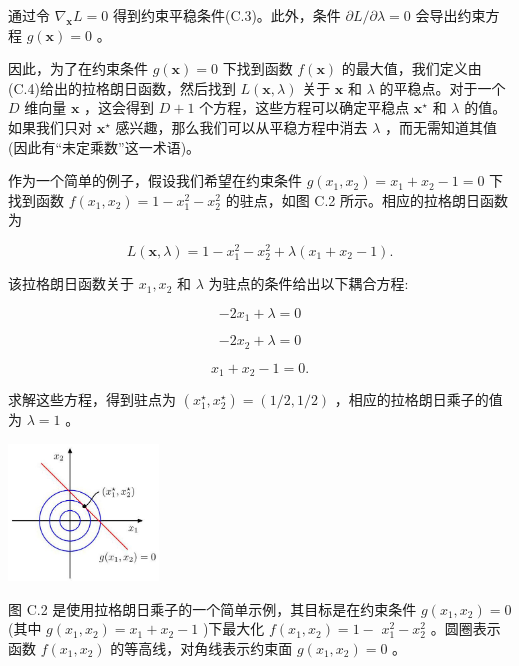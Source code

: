 \documentclass[10pt]{report}
\begin{document}
通过令 \({\nabla }_{\mathbf{x}}L = 0\) 得到约束平稳条件(C.3)。此外，条件 \(\partial L/\partial \lambda  = 0\) 会导出约束方程 \(g\left( \mathbf{x}\right)  = 0\) 。

因此，为了在约束条件 \(g\left( \mathbf{x}\right)  = 0\) 下找到函数 \(f\left( \mathbf{x}\right)\) 的最大值，我们定义由(C.4)给出的拉格朗日函数，然后找到 \(L\left( {\mathbf{x},\lambda }\right)\) 关于 \(\mathbf{x}\) 和 \(\lambda\) 的平稳点。对于一个 \(D\) 维向量 \(\mathbf{x}\) ，这会得到 \(D + 1\) 个方程，这些方程可以确定平稳点 \({\mathbf{x}}^{ \star  }\) 和 \(\lambda\) 的值。如果我们只对 \({\mathbf{x}}^{ \star  }\) 感兴趣，那么我们可以从平稳方程中消去 \(\lambda\) ，而无需知道其值(因此有“未定乘数”这一术语)。

作为一个简单的例子，假设我们希望在约束条件 \(g\left( {{x}_{1},{x}_{2}}\right)  = {x}_{1} + {x}_{2} - 1 = 0\) 下找到函数 \(f\left( {{x}_{1},{x}_{2}}\right)  = 1 - {x}_{1}^{2} - {x}_{2}^{2}\) 的驻点，如图 C.2 所示。相应的拉格朗日函数为

\[
L\left( {\mathbf{x},\lambda }\right)  = 1 - {x}_{1}^{2} - {x}_{2}^{2} + \lambda \left( {{x}_{1} + {x}_{2} - 1}\right) . \tag{C.5}
\]

该拉格朗日函数关于 \({x}_{1},{x}_{2}\) 和 \(\lambda\) 为驻点的条件给出以下耦合方程:

\[
- 2{x}_{1} + \lambda  = 0 \tag{C.6}
\]

\[
- 2{x}_{2} + \lambda  = 0 \tag{C.7}
\]

\[
{x}_{1} + {x}_{2} - 1 = 0. \tag{C.8}
\]

求解这些方程，得到驻点为 \(\left( {{x}_{1}^{ \star  },{x}_{2}^{ \star  }}\right)  = \left( {1/2,1/2}\right)\) ，相应的拉格朗日乘子的值为 \(\lambda  = 1\) 。

\begin{center}
\includegraphics[max width=0.3\textwidth]{images/0194e279-9b28-703a-88f4-c3ac21e2010d_642_1098_344_450_409_0.jpg}
\end{center}
\hspace*{3em} 

图 C.2 是使用拉格朗日乘子的一个简单示例，其目标是在约束条件 \(g\left( {{x}_{1},{x}_{2}}\right)  = 0\) (其中 \(g\left( {{x}_{1},{x}_{2}}\right)  = {x}_{1} + {x}_{2} - 1\) )下最大化 \(f\left( {{x}_{1},{x}_{2}}\right)  = 1 -\)  \({x}_{1}^{2} - {x}_{2}^{2}\) 。圆圈表示函数 \(f\left( {{x}_{1},{x}_{2}}\right)\) 的等高线，对角线表示约束面 \(g\left( {{x}_{1},{x}_{2}}\right)  = 0\) 。
\end{document}
